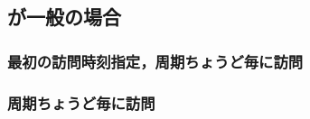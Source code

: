 \subsection{{\timelimit}が一般の場合}


\begin{frame}{}
	
\end{frame}




\subsubsection{最初の訪問時刻指定，周期ちょうど毎に訪問}


\begin{frame}{}
	
\end{frame}




\subsubsection{周期ちょうど毎に訪問}


\begin{frame}{}
	
\end{frame}




